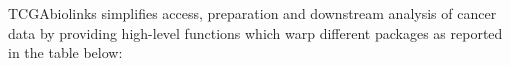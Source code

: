 TCGAbiolinks simplifies access, preparation and downstream analysis of cancer data by providing high-level functions
which warp different packages as reported in the table below:  

